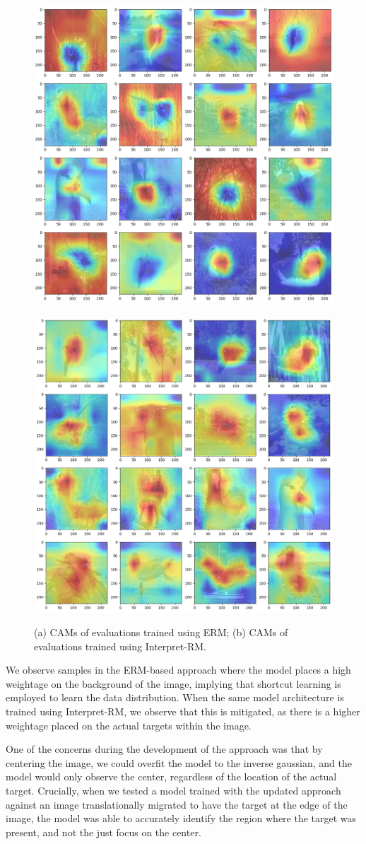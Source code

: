 \documentclass{article} %
\begin{document}
\begin{figure}[h]
	\centering
	\includegraphics[width=.468\textwidth]{figs/default}
	\ \ \ \ \ \ 
	\includegraphics[width=.468\textwidth]{figs/camloss}
	\caption{(a) CAMs of evaluations trained using ERM; (b) CAMs of evaluations trained using Interpret-RM.}
\end{figure}

We observe samples in the ERM-based approach where the model places a high weightage on the background of the image, implying that shortcut learning is employed to learn the data distribution. When the same model architecture is trained using Interpret-RM, we observe that this is mitigated, as there is a higher weightage placed on the actual targets within the image.

One of the concerns during the development of the approach was that by centering the image, we could overfit the model to the inverse gaussian, and the model would only observe the center, regardless of the location of the actual target. Crucially, when we tested a model trained with the updated approach against an image translationally migrated to have the target at the edge of the image, the model was able to accurately identify the region where the target was present, and not the just focus on the center. 
\end{document}
